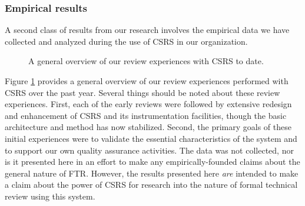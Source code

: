 \subsubsection{Empirical results}

A second class of results from our research involves the empirical data we
have collected and analyzed during the use of CSRS in our organization.

\begin{figure}                                        
 {\centerline{}}
\caption{A general overview of our review experiences with CSRS to date.}
\label{fig:review-summary-data}
\end{figure}

Figure \ref{fig:review-summary-data}  provides a general overview of our
review experiences performed with CSRS over the past year. Several things
should be noted about these review experiences. First, each of the early
reviews were followed by extensive redesign and enhancement of CSRS and its
instrumentation facilities, though the basic architecture and method has
now stabilized.  Second, the primary goals of these initial experiences
were to validate the essential characteristics of the system and to support
our own quality assurance activities.  The data was not collected, nor is
it presented here in an effort to make any empirically-founded claims about
the general nature of FTR.  However, the results presented here {\em are}\/
intended to make a claim about the power of CSRS for research into the
nature of formal technical review using this system. 


